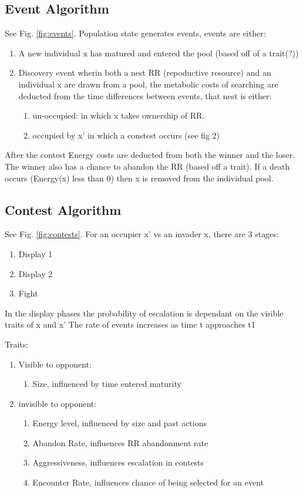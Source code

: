 \documentclass[a4paper,11pt]{article}
\begin{document}
\subsection{Event Algorithm}
See Fig. \ref{fig:events}. Population state generates events, events are either:
\begin{enumerate}
    \item A new individual x has matured and entered the pool (based off of a trait(?))
    \item Discovery event wherin both a nest RR (repoductive resource) and an individual x are drawn from a pool, the metabolic costs of searching are deducted from the time differences between events, that nest is either:
    \begin{enumerate}
        \item un-occupied: in which x takes ownership of RR.
        \item occupied by x' in which a constest occurs (see fig 2)
    \end{enumerate}
\end{enumerate}
After the contest Energy costs are deducted from both the winner and the loser.
The winner also has a chance to abandon the RR (based off a trait).
If a death occurs (Energy(x) less than 0) then x is removed from the individual pool.

\subsection{Contest Algorithm}
See Fig. \ref{fig:contests}.
For an occupier x' vs an invader x, there are 3 stages:
\begin{enumerate}
    \item Display 1
    \item Display 2
    \item Fight
\end{enumerate}
In the display phases the probability of escalation is dependant on the visible traits of x and x'
The rate of events increases as time t approaches t1

Traits:
\begin{enumerate}
    \item Visible to opponent:
    \begin{enumerate}
        \item Size, influenced by time entered maturity
    \end{enumerate}
    \item invisible to opponent:
    \begin{enumerate}
        \item Energy level, influenced by size and past actions
        \item Abandon Rate, influences RR abandonment rate
        \item Aggressiveness, influences escalation in contests
        \item Encounter Rate, influences chance of being selected for an event
    \end{enumerate}
\end{enumerate}
\clearpage
\end{document}
